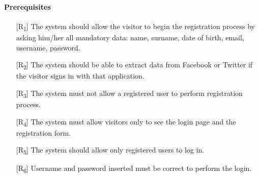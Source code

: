 \documentclass[12pt,titlepage]{article}
\begin{document}
\paragraph{Prerequisites}
\begin{itemize}
\item[{[R\textsubscript{1}]}] The system should allow the visitor to begin the registration process by asking him/her all mandatory data: name, surname, date of birth, email, username, password.
\item[{[R\textsubscript{2}]}] The system should be able to extract data from Facebook or Twitter if the visitor signs in with that application.
\item[{[R\textsubscript{3}]}] The system must not allow a registered user to perform registration process.
\item[{[R\textsubscript{4}]}] The system must allow visitors only to see the login page and the registration form.
\item[{[R\textsubscript{5}]}] The system should allow only registered users to log in.
\item[{[R\textsubscript{6}]}] Username and password inserted must be correct to perform the login.


\end{itemize}
\end{document}
